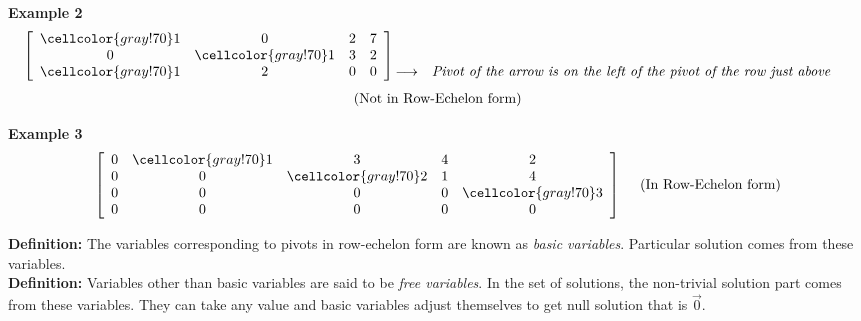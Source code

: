 \documentclass{article}
\newcommand\bg{\cellcolor{gray!70}}
\begin{document}
\textbf{Example 2} 
\[
 \left[\begin{array}{cccc}
    \bg1 &0 &2 &7\\  
     0 &\bg1 &3 &2\\
     \bg1 &2 &0 &0
  \end{array}\right]
  \begin{matrix}
    &&\\
    &&\\
    \longrightarrow &\emph{Pivot of the arrow is on the left of the pivot of the row just above}\\
  \end{matrix}\\
\]
\begin{align}
    \centering
  \text{(Not in Row-Echelon form)} \nonumber
\end{align}


\textbf{Example 3}
\[
\left[\begin{array}{ccccc}
    0 &\bg1 &3 &4 &2\\
    0 &0 &\bg2 &1 &4\\
    0 &0 &0 &0 &\bg3\\
    0 &0 &0 &0 &0
  \end{array}\right] ~~~~  \text{(In Row-Echelon form)}
\]


\textbf{Definition:}
The variables corresponding to pivots in row-echelon form are known as \textit{basic variables}. Particular solution comes from these variables.\\

\textbf{Definition:} Variables other than basic variables are said to be \textit{free variables}. In the set of solutions, the non-trivial solution part comes from these variables. They can take any value and basic variables adjust themselves to get null solution that is $\vec{0}$.
\end{document}
